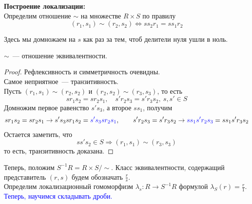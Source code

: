 \documentclass[11pt]{report}
\begin{document}
    \textbf{Построение локализации:}\\

    Определим отношение $\sim$ на множестве $R \times S$ по правилу
    \[ (r_1, s_1) \sim (r_2, s_2) \Longleftrightarrow s s_2 r_1 = s s_1 r_2 \]
    \begin{remark}
        Здесь мы домножаем на $s$ как раз за тем, чтоб делители нуля ушли в ноль.
    \end{remark}
    \begin{statement}
        $\sim$~--- отношение эквивалентности.
    \end{statement}
    \begin{proof}
        Рефлексивность и симметричность очевидны. \\
        Самое неприятное~--- транзитивность.\\
        Пусть $(r_1, s_1) \sim (r_2, s_2)$ и $(r_2, s_2) \sim (r_3, s_3)$, то есть
        \[ s r_1 s_2 = s r_2 s_1, \quad s' r_2 s_3 = s' r_3 s_2, \ s, s' \in S \]
        Домножим первое равенство $s' s_3$, а второе $s s_1$, получим
        \[ s r_1 s_2 = s r_2 s_1 \to s' s_3 s r_1 s_2 = \textcolor{blue}{s' s_3 s r_2 s_1}, \qquad s' r_2 s_3 = s' r_3 s_2 \to \textcolor{blue}{s s_1 s' r_2 s_3}  = s s_1 s' r_3 s_2 \]
        Остается заметить, что
        \[ s s' s_2 \in S \Rightarrow (r_1, s_1) \sim (r_3, s_3) \]
        то есть, транзитивность доказана.
    \end{proof}

    Теперь, положим $S^{-1}R = R \times S / \sim$. Класс эквивалентности, содержащий представитель $(r, s)$ будем обозначать
    $\frac{r}{s}$.\\
    Определим локализационный гомоморфизм $\lambda_s\colon R \to S^{-1}R$ формулой $\lambda_{S}(r) = \frac{r}{1}$.\\

    \textcolor{blue}{Теперь, научимся складывать дроби.}
\end{document}

